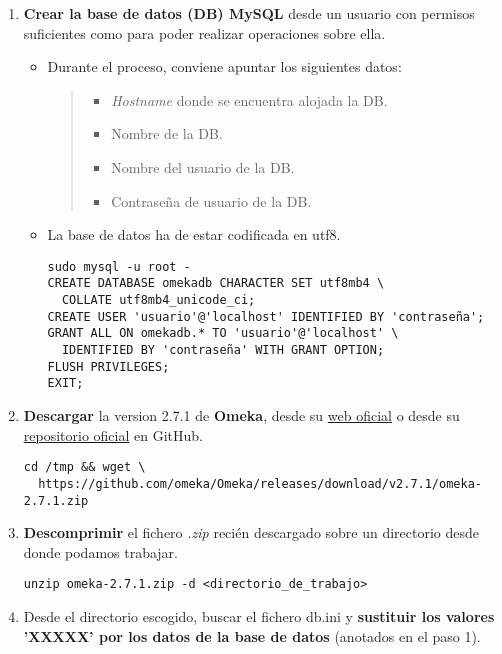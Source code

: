 \begin{enumerate}
\def\labelenumi{\arabic{enumi}.}
\tightlist
\item
  \textbf{Crear la base de datos (DB) MySQL} desde un usuario con
  permisos suficientes como para poder realizar operaciones sobre ella.
  \begin{itemize}
  \item
    Durante el proceso, conviene apuntar los siguientes datos:
    \begin{quote}
    \begin{itemize}
    \tightlist
    \item
      \emph{Hostname} donde se encuentra alojada la DB.
    \item
      Nombre de la DB.
    \item
      Nombre del usuario de la DB.
    \item
      Contraseña de usuario de la DB.
    \end{itemize}
    \end{quote}
  \item
    La base de datos ha de estar codificada en {utf8}.
\begin{verbatim}
sudo mysql -u root -
CREATE DATABASE omekadb CHARACTER SET utf8mb4 \
  COLLATE utf8mb4_unicode_ci;
CREATE USER 'usuario'@'localhost' IDENTIFIED BY 'contraseña';
GRANT ALL ON omekadb.* TO 'usuario'@'localhost' \
  IDENTIFIED BY 'contraseña' WITH GRANT OPTION;
FLUSH PRIVILEGES;
EXIT;
\end{verbatim}
\end{itemize}
\item
  \textbf{Descargar} la version 2.7.1 de \textbf{Omeka}, desde su \href{https://omeka.org/classic/download/}{web oficial} o desde su \href{http://github.com/omeka/Omeka}{repositorio oficial} en
  GitHub.
\begin{verbatim}
cd /tmp && wget \
  https://github.com/omeka/Omeka/releases/download/v2.7.1/omeka-2.7.1.zip
\end{verbatim}
\item
  \textbf{Descomprimir} el fichero \emph{.zip} recién descargado sobre un
  directorio desde donde podamos trabajar.  
\begin{verbatim}
unzip omeka-2.7.1.zip -d <directorio_de_trabajo>
\end{verbatim}
\item
  Desde el directorio escogido, buscar el fichero {db.ini} y
  \textbf{sustituir los valores 'XXXXX' por los datos de la base de
  datos} (anotados en el paso 1).
\begin{verbatim}

\end{verbatim}
\end{enumerate}
